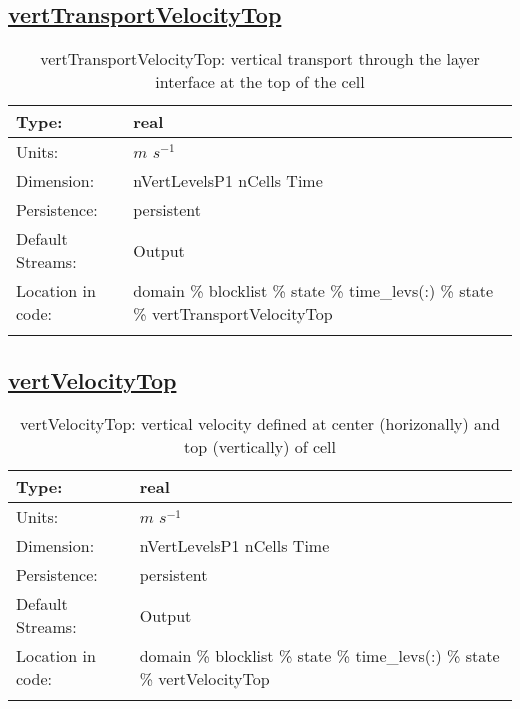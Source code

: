 \subsection[vertTransportVelocityTop]{\hyperref[sec:var_tab_state]{vertTransportVelocityTop}}
\label{subsec:var_sec_state_vertTransportVelocityTop}
\begin{center}
\begin{longtable}{| p{2.0in} | p{4.0in} |}
        \hline 
        Type: & real \\
        \hline 
        Units: & $m$ $s^{-1}$ \\
        \hline 
        Dimension: & nVertLevelsP1 nCells Time \\
        \hline 
        Persistence: & persistent \\
        \hline 
		 Default Streams: & Output  \\
        \hline 
		 Location in code: & domain \% blocklist \% state \% time\_levs(:) \% state \% vertTransportVelocityTop \\
		 \hline 
    \caption{vertTransportVelocityTop: vertical transport through the layer interface at the top of the cell}
\end{longtable}
\end{center}
\subsection[vertVelocityTop]{\hyperref[sec:var_tab_state]{vertVelocityTop}}
\label{subsec:var_sec_state_vertVelocityTop}
\begin{center}
\begin{longtable}{| p{2.0in} | p{4.0in} |}
        \hline 
        Type: & real \\
        \hline 
        Units: & $m$ $s^{-1}$ \\
        \hline 
        Dimension: & nVertLevelsP1 nCells Time \\
        \hline 
        Persistence: & persistent \\
        \hline 
		 Default Streams: & Output  \\
        \hline 
		 Location in code: & domain \% blocklist \% state \% time\_levs(:) \% state \% vertVelocityTop \\
		 \hline 
    \caption{vertVelocityTop: vertical velocity defined at center (horizonally) and top (vertically) of cell}
\end{longtable}
\end{center}
